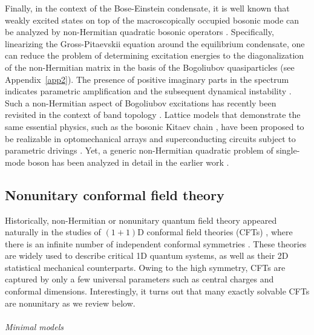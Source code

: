 \documentclass{tADP2e}
\theoremstyle{plain}
\theoremstyle{plain}
\theoremstyle{definition}
\begin{document}
Finally, in the context of the Bose-Einstein condensate, it is well known that weakly excited states on top of the macroscopically occupied bosonic mode can be analyzed by non-Hermitian quadratic bosonic operators \cite{BECbook}. Specifically,  linearizing the Gross-Pitaevskii equation around the equilibrium condensate, one can reduce the problem of determining excitation energies to the diagonalization of the non-Hermitian matrix in the basis of the Bogoliubov quasiparticles (see Appendix~\ref{app2}). The presence of positive imaginary parts in the spectrum indicates parametric amplification and the subsequent dynamical instability \cite{CC01,BNR14}. Such a non-Hermitian aspect of Bogoliubov excitations has recently been revisited in the context of band topology \cite{OT20}. Lattice models that demonstrate the same essential physics, such as the bosonic Kitaev chain \cite{MA18}, have been proposed to be realizable in optomechanical arrays and superconducting circuits subject to parametric drivings \cite{AN19}. Yet, a generic non-Hermitian quadratic problem of single-mode boson  has been analyzed in detail in the earlier work \cite{SMS04}. 


\subsection{Nonunitary conformal field theory}
\label{nonunitary_cft}
Historically, non-Hermitian or nonunitary quantum field theory appeared naturally in the studies of $(1+1)$D {conformal field theories} (CFTs) \cite{DFP12}, where there is an {infinite} number of independent conformal symmetries \cite{AAB84}. These theories are widely used to describe {critical} 1D quantum systems, as well as their 2D statistical mechanical counterparts. Owing to the high symmetry, CFTs are captured by only a few universal parameters such as central charges and conformal dimensions. Interestingly, it turns out that many exactly solvable CFTs are nonunitary as we review below. 
\\ \\ {\it Minimal models}
\end{document}
